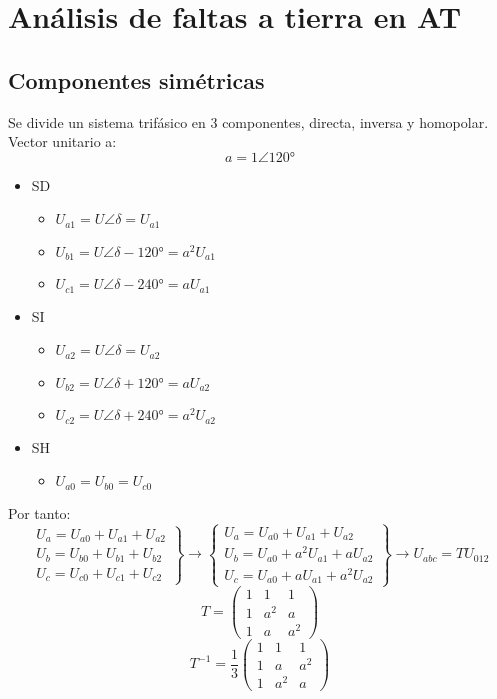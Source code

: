 \chapter{Análisis de faltas a tierra en AT}
\section{Componentes simétricas}
Se divide un sistema trifásico en 3 componentes, directa, inversa y homopolar.
Vector unitario a:
\begin{equation}
	a=1\angle\ang{120}
\end{equation}
\begin{itemize}
	\item SD
	\begin{itemize}
		\item $U_{a1}=U\angle \delta=U_{a1}$ 
		\item $U_{b1}=U\angle \delta -\ang{120}=a^2U_{a1}$
		\item $U_{c1}=U\angle \delta -\ang{240}=aU_{a1}$
	\end{itemize}
	\item SI
	\begin{itemize}
		\item $U_{a2}=U\angle \delta=U_{a2}$
		\item $U_{b2}=U\angle \delta+\ang{120}=aU_{a2}$
		\item $U_{c2}=U\angle \delta+\ang{240}=a^2U_{a2}$
	\end{itemize}
	\item SH
	\begin{itemize}
		\item $U_{a0}=U_{b0}=U_{c0}$
	\end{itemize}
\end{itemize}
Por tanto:
\begin{equation}
	\left.
	\begin{matrix}
		U_a=U_{a0}+U_{a1}+U_{a2}\\
		U_b=U_{b0}+U_{b1}+U_{b2}\\
		U_c=U_{c0}+U_{c1}+U_{c2}
	\end{matrix} \right\}\rightarrow \left\{\begin{matrix}
	U_a=U_{a0}+U_{a1}+U_{a2}\\
	U_b=U_{a0}+a^2U_{a1}+aU_{a2}\\
	U_c=U_{a0}+aU_{a1}+a^2U_{a2}
	\end{matrix}\right\} \rightarrow U_{abc}=TU_{012}
\end{equation}
\begin{equation}
	T=\begin{pmatrix}
		1& 1&1\\
		1& a^2& a\\
		1& a& a^2
	\end{pmatrix}
\end{equation}
\begin{equation}
	T^{-1}=\dfrac{1}{3}\begin{pmatrix}
		1& 1& 1\\
		1& a& a^2\\
		1& a^2& a
	\end{pmatrix}
\end{equation}

